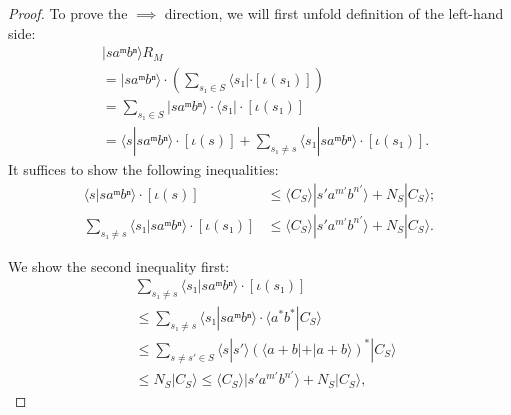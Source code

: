 \begin{proof}
  To prove the \(⟹\) direction, 
  we will first unfold definition of the left-hand side:
  \begin{align*}
    & | s aᵐ bⁿ ⟩ R_M \\
    & = | s aᵐ bⁿ ⟩ ⋅ (∑_{s₁ ∈ S} ⟨s₁| ⋅ [ι(s₁)]) \\   
    & = ∑_{s₁ ∈ S} | s aᵐ bⁿ ⟩ ⋅ ⟨s₁| ⋅ [ι(s₁)] \\  
    & = ⟨s| s aᵐ bⁿ ⟩ ⋅ [ι(s)] + ∑_{s₁ ≠ s} ⟨s₁| s aᵐ bⁿ ⟩ ⋅ [ι(s₁)].
  \end{align*}
  It suffices to show the following inequalities:
  \begin{align*}
    ⟨s| s aᵐ bⁿ ⟩ ⋅ [ι(s)] & ≤ ⟨C_S⟩ |s' a^{m'} b^{n'}⟩ + N_S |C_S⟩; \\  
    ∑_{s₁ ≠ s} ⟨s₁| s aᵐ bⁿ ⟩ ⋅ [ι(s₁)] & 
      ≤ ⟨C_S⟩ |s' a^{m'} b^{n'}⟩ + N_S |C_S⟩.
  \end{align*}

  We show the second inequality first:
  \begin{align*}
    & ∑_{s₁ ≠ s} ⟨s₁| s aᵐ bⁿ ⟩ ⋅ [ι(s₁)] \\   
    & ≤ ∑_{s₁ ≠ s} ⟨s₁| s aᵐ bⁿ ⟩ ⋅ ⟨a^* b^*|C_S⟩ \\  
    & ≤ ∑_{s ≠ s' ∈ S} ⟨s|s'⟩ (⟨a+b|+|a+b⟩)^* |C_S⟩\\
    & ≤ N_S |C_S⟩ ≤ ⟨C_S⟩ |s' a^{m'} b^{n'}⟩ + N_S |C_S⟩,
  \end{align*}


\end{proof}
